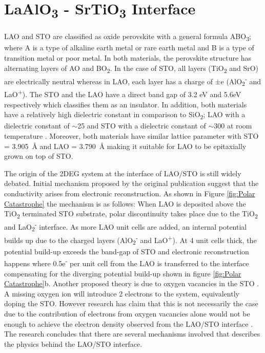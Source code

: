 \documentclass[11pt,a4paper]{report}
\begin{document}
\section{LaAlO\textsubscript{3} - SrTiO\textsubscript{3} Interface}
LAO and STO are classified as oxide perovskite with a general formula ABO\textsubscript{3}; where A is a type of alkaline earth metal or rare earth metal and B is a type of transition metal or poor metal. In both materials, the perovskite structure has alternating layers of AO and BO\textsubscript{2}. In the case of STO, all layers (TiO\textsubscript{2} and SrO) are electrically neutral whereas in LAO, each layer has a charge of $\pm$e (AlO\textsubscript{2}\textsuperscript{-} and LaO\textsuperscript{+}). The STO and the LAO have a direct band gap of 3.2 eV and 5.6eV respectively \cite{ohtomo_hwang_2004} which classifies them as an insulator. In addition, both materials have a relatively high dielectric constant in comparison to SiO\textsubscript{2}; LAO with a dielectric constant of $\sim$25 and STO with a dielectric constant of $\sim$300 at room temperature \cite{ohtomo_hwang_2004}. Moreover, both materials have similar lattice parameter with STO = \SI{3.905}{\angstrom} \cite{koster_1998} and LAO =  \SI{3.790}{\angstrom} \cite{geller_wood_1956} making it suitable for LAO to be epitaxially grown on top of STO.

The origin of the 2DEG system at the interface of LAO/STO is still widely debated. Initial mechanism proposed by the original publication \cite{ohtomo_hwang_2004} suggest that the conductivity arises from electronic reconstruction. As shown in Figure \ref{fig:Polar Catastrophe} the mechanism is as follows: When LAO is deposited above the TiO\textsubscript{2} terminated STO substrate, polar discontinuity takes place due to the TiO\textsubscript{2} and LaO\textsubscript{2}\textsuperscript{-} interface. As more LAO unit cells are added, an internal potential builds up due to the charged layers (AlO\textsubscript{2}\textsuperscript{-} and LaO\textsuperscript{+}). At 4 unit cells thick, the potential build-up exceeds the band-gap of STO and electronic reconstruction happens where 0.5e\textsuperscript{-} per unit cell from the LAO is transferred to the interface compensating for the diverging potential build-up shown in figure \ref{fig:Polar Catastrophe}b. Another proposed theory is due to oxygen vacancies in the STO \cite{kalabukhov_2007}. A missing oxygen ion will introduce 2 electrons to the system, equivalently doping the STO. However research has claim that this is not necessarily the case due to the contribution of electrons from oxygen vacancies alone would not be enough to achieve the electron density observed from the LAO/STO interface \cite{cantoni_gazquez_2012}. The research concludes that there are several mechanisms involved that describes the physics behind the LAO/STO interface. 
\end{document}
